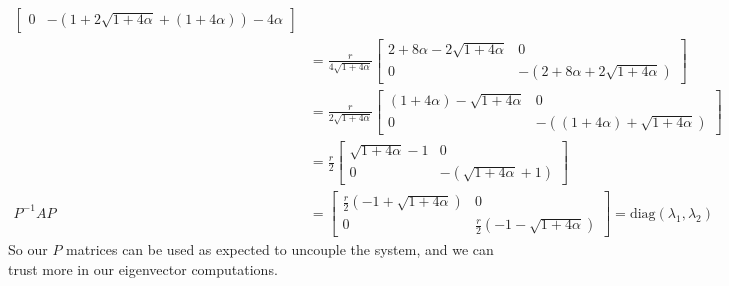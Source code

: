 \documentclass{article}
\begin{document}
\begin{align*}
\begin{bmatrix}
0	& -\left( 1 + 2\sqrt{1 + 4\alpha} +(1+4\alpha)\right) -4\alpha
\end{bmatrix}
\\
&=
\frac{r}{ 4\sqrt{1 + 4\alpha} }
\begin{bmatrix}
2 +8\alpha -2\sqrt{1 + 4\alpha}	&	0	\\
0	& -\left( 2 +8\alpha +2\sqrt{1 + 4\alpha}\right)
\end{bmatrix}
\\
&=
\frac{r}{ 2\sqrt{1 + 4\alpha} }
\begin{bmatrix}
(1 +4\alpha) -\sqrt{1 + 4\alpha}	&	0	\\
0	& -\left( (1 +4\alpha) +\sqrt{1 + 4\alpha}\right)
\end{bmatrix}
\\
&=
\frac{r}{ 2 }
\begin{bmatrix}
\sqrt{1 + 4\alpha} -1	&	0	\\
0	& -\left( \sqrt{1 + 4\alpha} +1 \right)
\end{bmatrix}
\\
P^{-1}AP &=
\begin{bmatrix}
\frac{r}{2}(-1 +\sqrt{1 + 4\alpha})	&	0	\\
0	& \frac{r}{2}(-1 -\sqrt{1 + 4\alpha})
\end{bmatrix}
= \text{diag}\left(\lambda_{1},\lambda_{2}\right)
\end{align*}
So our $P$ matrices can be used as expected to uncouple the system, and we can trust more in our eigenvector computations.
\end{document}
